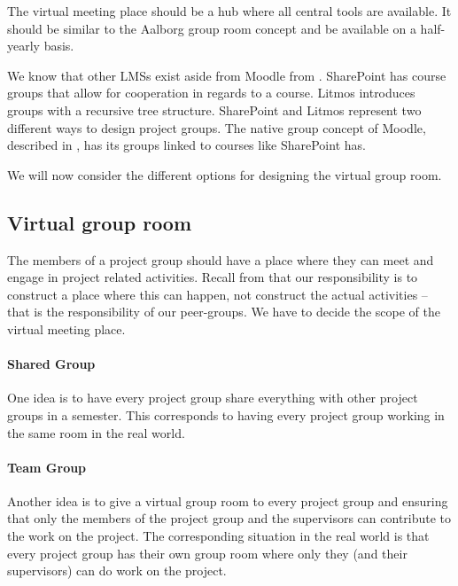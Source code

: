 The virtual meeting place should be a hub where all central tools are available. 
It should be similar to the Aalborg group room concept and be available on a half-yearly basis.  

We know that other LMSs exist aside from Moodle from . 
SharePoint has course groups that allow for cooperation in regards to a course. 
Litmos introduces groups with a recursive tree structure. 
SharePoint and Litmos represent two different ways to design project groups. 
The native group concept of Moodle, described in , has its groups linked to courses like SharePoint has.   
\\




We will now consider the different options for designing the virtual group room.

\subsection{Virtual group room}
The members of a project group should have a place where they can meet and engage in project related activities.
Recall from  that our responsibility is to construct a place where this can happen, not construct the actual activities -- that is the responsibility of our peer-groups.
We have to decide the scope of the virtual meeting place.

\paragraph{Shared Group} One idea is to have every project group share everything with other project groups in a semester.
This corresponds to having every project group working in the same room in the real world.

\paragraph{Team Group} Another idea is to give a virtual group room to every project group and ensuring that only the members of the project group and the supervisors can contribute to the work on the project.
The corresponding situation in the real world is that every project group has their own group room where only they (and their supervisors) can do work on the project. \\

